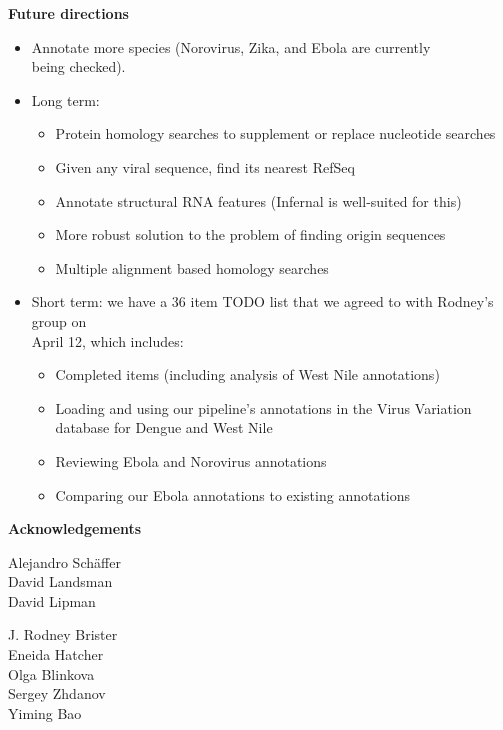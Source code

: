 \documentclass[landscape]{slides}
\begin{document}
\begin{slide}
\begin{center}
\textbf{Future directions}

\small
\begin{itemize}
\item Annotate more species (Norovirus, Zika, and Ebola are currently \\
  being checked).
\item Long term:
\begin{itemize}
\item  Protein homology searches to supplement or replace nucleotide searches
\item  Given any viral sequence, find its nearest RefSeq
\item  Annotate structural RNA features (Infernal is well-suited for this)
\item  More robust solution to the problem of finding origin sequences
\item  Multiple alignment based homology searches 
\end{itemize}

\item Short term: we have a 36 item TODO list that we agreed to with
  Rodney's group on \\ April 12, which includes:
\begin{itemize}
  \item Completed items (including analysis of West Nile annotations)
  \item Loading and using our pipeline's annotations in the Virus Variation
    database for Dengue and West Nile
  \item Reviewing Ebola and Norovirus annotations
  \item Comparing our Ebola annotations to existing annotations
\end{itemize}
\end{itemize}

\vfill
\end{center}
\end{slide}
\begin{slide}

\large
\begin{center}
\large{\textbf{Acknowledgements}} \\

\vspace{0.5in}

Alejandro Sch\"{a}ffer \\
David Landsman \\
David Lipman

\vspace{0.5in}

J. Rodney Brister \\
Eneida Hatcher \\
Olga Blinkova \\
Sergey Zhdanov \\ 
Yiming Bao \\

\end{center}

\vfill
\end{slide}
\end{document}

